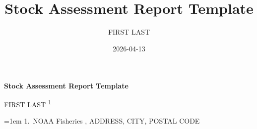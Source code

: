 \documentclass[
  letterpaper,
]{article}
\title{Stock Assessment Report Template}
\author{FIRST LAST}
\date{2026-04-13}
\begin{document}
  \begin{titlepage}

  \begin{minipage}[b][\textheight][s]{\textwidth}


  \raggedright




  {\huge\bfseries\nohyphens{Stock Assessment Report
  Template}}\\[1\baselineskip]



  \vspace{2\baselineskip}


  \vspace{1\baselineskip}

  {\large{FIRST LAST}}%
  {\textsuperscript{1}}%



  \vspace{2\baselineskip}

  \hangindent=1em
  {1}.~{NOAA Fisheries}%
  , %
  {ADDRESS, CITY, POSTAL CODE}%


  \vspace{1\baselineskip}



\end{minipage}
\end{titlepage}
\end{document}
